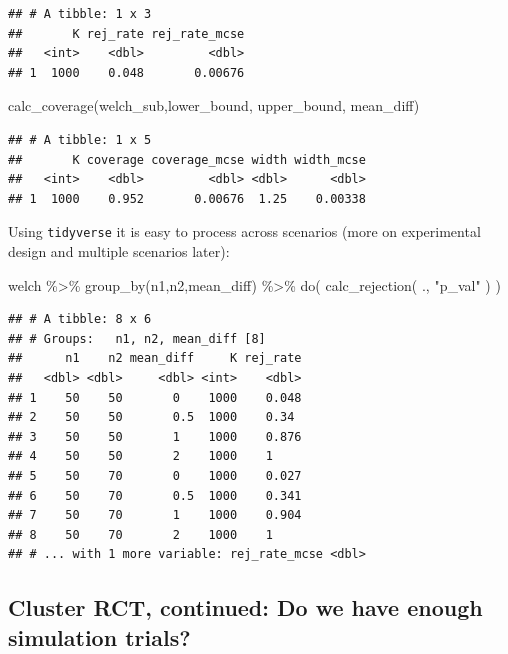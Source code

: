\documentclass[
]{book}
\newenvironment{Shaded}{\begin{snugshade}}{\end{snugshade}}
\newcommand{\FunctionTok}[1]{\textcolor[rgb]{0.00,0.00,0.00}{#1}}
\newcommand{\NormalTok}[1]{#1}
\newcommand{\SpecialCharTok}[1]{\textcolor[rgb]{0.00,0.00,0.00}{#1}}
\newcommand{\StringTok}[1]{\textcolor[rgb]{0.31,0.60,0.02}{#1}}
\begin{document}
\begin{verbatim}
## # A tibble: 1 x 3
##       K rej_rate rej_rate_mcse
##   <int>    <dbl>         <dbl>
## 1  1000    0.048       0.00676
\end{verbatim}

\begin{Shaded}
\begin{Highlighting}[]
\FunctionTok{calc\_coverage}\NormalTok{(welch\_sub,lower\_bound, upper\_bound, mean\_diff)}
\end{Highlighting}
\end{Shaded}

\begin{verbatim}
## # A tibble: 1 x 5
##       K coverage coverage_mcse width width_mcse
##   <int>    <dbl>         <dbl> <dbl>      <dbl>
## 1  1000    0.952       0.00676  1.25    0.00338
\end{verbatim}

Using \texttt{tidyverse} it is easy to process across scenarios (more on experimental design and multiple scenarios later):

\begin{Shaded}
\begin{Highlighting}[]
\NormalTok{welch }\SpecialCharTok{\%\textgreater{}\%} \FunctionTok{group\_by}\NormalTok{(n1,n2,mean\_diff) }\SpecialCharTok{\%\textgreater{}\%}
  \FunctionTok{do}\NormalTok{( }\FunctionTok{calc\_rejection}\NormalTok{( ., }\StringTok{"p\_val"}\NormalTok{ ) )}
\end{Highlighting}
\end{Shaded}

\begin{verbatim}
## # A tibble: 8 x 6
## # Groups:   n1, n2, mean_diff [8]
##      n1    n2 mean_diff     K rej_rate
##   <dbl> <dbl>     <dbl> <int>    <dbl>
## 1    50    50       0    1000    0.048
## 2    50    50       0.5  1000    0.34 
## 3    50    50       1    1000    0.876
## 4    50    50       2    1000    1    
## 5    50    70       0    1000    0.027
## 6    50    70       0.5  1000    0.341
## 7    50    70       1    1000    0.904
## 8    50    70       2    1000    1    
## # ... with 1 more variable: rej_rate_mcse <dbl>
\end{verbatim}

\hypertarget{cluster-rct-continued-do-we-have-enough-simulation-trials}{%
\subsection{Cluster RCT, continued: Do we have enough simulation trials?}\label{cluster-rct-continued-do-we-have-enough-simulation-trials}}
\end{document}
